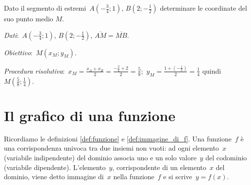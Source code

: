 \begin{exrig}
 \begin{esempio}
Dato il segmento di estremi~$A\left(-{\frac{3}{4}};1\right)$, $B\left(2;-\frac{1}{2}\right)$ determinare le coordinate del suo punto medio $M$.

\emph{Dati}:~$A\left(-{\frac{3}{4}};1\right)$, $B\left(2;-\frac{1}{2}\right)$, $\overline{AM}=\overline{MB}$.

\emph{Obiettivo}:~$M(x_{M};y_{M})$.

\emph{Procedura risolutiva}:~$x_{M}=\frac{x_{A}+x_{B}}{2}=\frac{-{\frac{3}{4}}+2}{2}=\frac{5}{8}$;\,
$y_{M}=\frac{1+\left(-{\frac{1}{2}}\right)}{2}=\frac{1}{4}$ quindi~$M\left(\frac{5}{8};\frac{1}{4}\right)$.
 \end{esempio}
\end{exrig}

\ovalbox{\risolvii \ref{ese:\thechapter.34}, \ref{ese:\thechapter.35}, \ref{ese:\thechapter.36}, \ref{ese:\thechapter.37}, \ref{ese:\thechapter.38}}


\section{Il grafico di una funzione}

Ricordiamo le definizioni \ref{def:funzione} e \ref{def:immagine_di_f}. Una funzione~$f$ è una corrispondenza univoca tra due insiemi non vuoti: ad ogni elemento~$x$ (variabile indipendente) del dominio associa uno e un solo valore~$y$ del codominio (variabile dipendente).
L'elemento~$y$, corrispondente di un elemento~$x$ del dominio, viene detto immagine di~$x$ nella funzione~$f$ e si scrive~$y=f(x)$.

